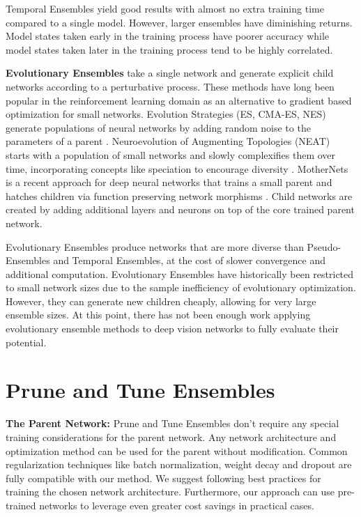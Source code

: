\documentclass[letterpaper]{article} %
\begin{document}
Temporal Ensembles yield good results with almost no extra training time compared to a single model. However, larger ensembles have diminishing returns. Model states taken early in the training process have poorer accuracy while model states taken later in the training process tend to be highly correlated.

\textbf{Evolutionary Ensembles} take a single network and generate explicit child networks according to a perturbative process. These methods have long been popular in the reinforcement learning domain as an alternative to gradient based optimization for small networks. Evolution Strategies (ES, CMA-ES, NES) generate populations of neural networks by adding random noise to the parameters of a parent \cite{salimans2017evolution, hansen2003reducing, wierstra2011natural}. Neuroevolution of Augmenting Topologies (NEAT) starts with a population of small networks and slowly complexifies them over time, incorporating concepts like speciation to encourage diversity \cite{stanley2002evolving}. MotherNets is a recent approach for deep neural networks that trains a small parent and hatches children via function preserving network morphisms \cite{wasay2020mothernets}. Child networks are created by adding additional layers and neurons on top of the core trained parent network.

Evolutionary Ensembles produce networks that are more diverse than Pseudo-Ensembles and Temporal Ensembles, at the cost of slower convergence and additional computation. Evolutionary Ensembles have historically been restricted to small network sizes due to the sample inefficiency of evolutionary optimization. However, they can generate new children cheaply, allowing for very large ensemble sizes. At this point, there has not been enough work applying evolutionary ensemble methods to deep vision networks to fully evaluate their potential.

\section{Prune and Tune Ensembles}

\textbf{The Parent Network:} Prune and Tune Ensembles don't require any special training considerations for the parent network. Any network architecture and optimization method can be used for the parent without modification. Common regularization techniques like batch normalization, weight decay and dropout are fully compatible with our method. We suggest following best practices for training the chosen network architecture. Furthermore, our approach can use pre-trained networks to leverage even greater cost savings in practical cases.
\end{document}
